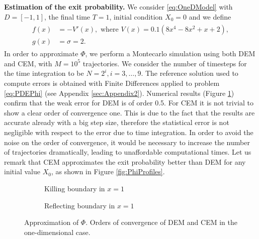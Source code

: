 
\vspace{2mm}
\noindent \textbf{Estimation of the exit probability.} We consider \eqref{eq:OneDModel} with $D = \left[ -1, 1 \right]$, the final time $T = 1$, initial condition $X_0 = 0$ and we define
\begin{align}\label{eq:FunctionsOneDSmoothPhi}
\begin{split}
	f(x) &= -V'(x), \text{ where } V(x) = 0.1(8x^4 - 8x^2 + x + 2), \\
	g(x) &= \sigma = 2.
\end{split}
\end{align}
In order to approximate $\Phi$, we perform a Montecarlo simulation using both DEM and CEM, with $M = 10^5$ trajectories. We consider the number of timesteps for the time integration to be $N = 2^i, i = 3, \dots, 9$. The reference solution used to compute errors is obtained with Finite Differences applied to problem \eqref{eq:PDEPhi} (see Appendix \ref{sec:Appendix2}). Numerical results (Figure \ref{fig:KillOneDPhi}) confirm that the weak error for DEM is of order 0.5. For CEM it is not trivial to show a clear order of convergence one. This is due to the fact that the results are accurate already with a big step size, therefore the statistical error is not negligible with respect to the error due to time integration. In order to avoid the noise on the order of convergence, it would be necessary to increase the number of trajectories dramatically, leading to unaffordable computational times. Let us remark that CEM approximates the exit probability better than DEM for any initial value $X_0$, as shown in Figure \ref{fig:PhiProfiles}.

\begin{figure}[t]
    \centering
    \begin{subfigure}{0.49\linewidth}
        \centering
        \resizebox{1\linewidth}{!}{ }  
        \caption{Killing boundary in $x = 1$}
        \label{fig:KillOneDPhi}
    \end{subfigure}
    \begin{subfigure}{0.49\linewidth}
        \centering
        \resizebox{1\linewidth}{!}{ }  
        \caption{Reflecting boundary in $x = 1$}
        \label{fig:ReflectOneDPhi}
    \end{subfigure}    
    \caption{Approximation of $\Phi$. Orders of convergence of DEM and CEM in the one-dimensional case.}
    \label{fig:OrdersOneDPhi}
\end{figure}

